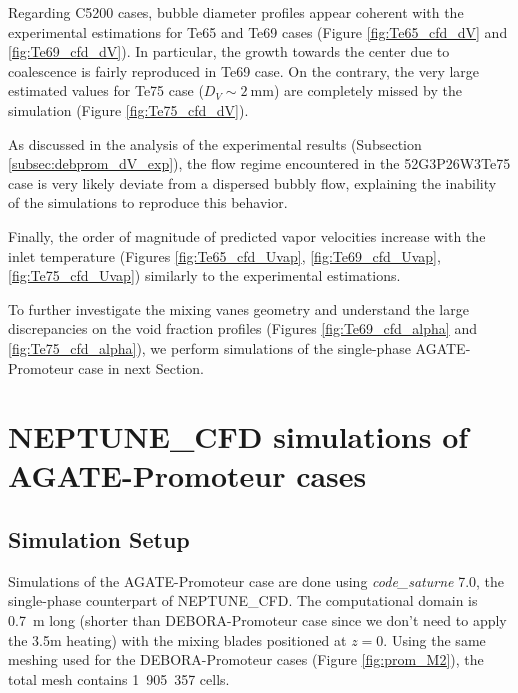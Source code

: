 \npar

Regarding C5200 cases, bubble diameter profiles appear coherent with the experimental estimations for Te65 and Te69 cases (Figure \ref{fig:Te65_cfd_dV} and \ref{fig:Te69_cfd_dV}). In particular, the growth towards the center due to coalescence is fairly reproduced in Te69 case. On the contrary, the very large estimated values for Te75 case ($D_{V} \sim 2\ $mm) are completely missed by the simulation (Figure \ref{fig:Te75_cfd_dV}).

\begin{remark*}{}
As discussed in the analysis of the experimental results (Subsection \ref{subsec:debprom_dV_exp}), the flow regime encountered in the 52G3P26W3Te75 case is very likely deviate from a dispersed bubbly flow, explaining the inability of the simulations to reproduce this behavior.
\end{remark*}


\npar


Finally, the order of magnitude of predicted vapor velocities increase with the inlet temperature (Figures \ref{fig:Te65_cfd_Uvap}, \ref{fig:Te69_cfd_Uvap}, \ref{fig:Te75_cfd_Uvap}) similarly to the experimental estimations.

\npar


To further investigate the mixing vanes geometry and understand the large discrepancies on the void fraction profiles (Figures \ref{fig:Te69_cfd_alpha} and \ref{fig:Te75_cfd_alpha}), we perform simulations of the single-phase AGATE-Promoteur case in next Section.





\section{NEPTUNE\_CFD simulations of AGATE-Promoteur cases}
\label{sec:agate_ncfd}


\subsection{Simulation Setup}

Simulations of the AGATE-Promoteur case are done using \textit{code\_saturne} 7.0, the single-phase counterpart of NEPTUNE\_CFD. The computational domain is 0.7\ m long (shorter than DEBORA-Promoteur case since we don't need to apply the 3.5m heating) with the mixing blades positioned at $z=0$. Using the same meshing used for the DEBORA-Promoteur cases (Figure \ref{fig:prom_M2}), the total mesh contains 1~905~357 cells.


